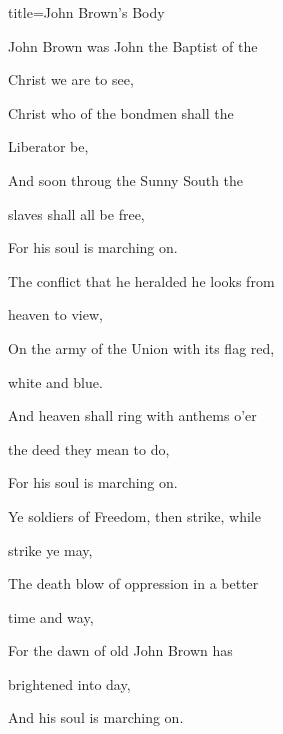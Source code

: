 \begin{song}{title=\predtitle \centering John Brown's Body \\\large  }
{\begin{centerjustified}
\begin{varwidth}[t]{0.5\textwidth}



\end{varwidth}\begin{varwidth}[t]{0.55\textwidth}\setlength{\parindent}{\pindent}
\vspace*{0.03cm}


\sloka
John Brown was John the Baptist of the

Christ we are to see,

Christ who of the bondmen shall the

Liberator be,

And soon throug the Sunny South the

slaves shall all be free,

For his soul is marching on.



\sloka
The conflict that he heralded he looks from

heaven to view,

On the army of the Union with its flag red,

white and blue.

And heaven shall ring with anthems o’er

the deed they mean to do,

For his soul is marching on.


\sloka
Ye soldiers of Freedom, then strike, while

strike ye may,

The death blow of oppression in a better

time and way,

For the dawn of old John Brown has

brightened into day,

And his soul is marching on.


\end{varwidth}
\end{centerjustified}
}

\setcounter{Slokočet}{0}
\end{song}
